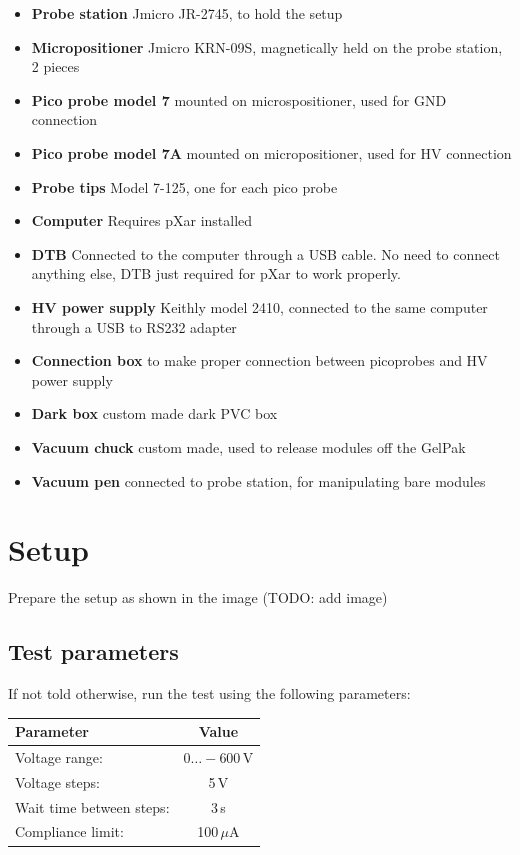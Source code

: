 \documentclass[10pt]{unlsilabsop}
\begin{document}
\begin{itemize}
\item \textbf{Probe station} Jmicro JR-2745, to hold the setup
\item \textbf{Micropositioner} Jmicro KRN-09S, magnetically held on the probe station, 2 pieces
\item \textbf{Pico probe model 7} mounted on microspositioner, used for GND connection
\item \textbf{Pico probe model 7A} mounted on micropositioner, used for HV connection
\item \textbf{Probe tips} Model 7-125, one for each pico probe
\item \textbf{Computer} Requires pXar installed
\item \textbf{DTB} Connected to the computer through a USB cable. No need to connect anything else, DTB just required for pXar to work properly.
\item \textbf{HV power supply} Keithly model 2410, connected to the same computer through a USB to RS232 adapter
\item \textbf{Connection box} to make proper connection between picoprobes and HV power supply
\item \textbf{Dark box} custom made dark PVC box
\item \textbf{Vacuum chuck} custom made, used to release modules off the GelPak
\item \textbf{Vacuum pen} connected to probe station, for manipulating bare modules
\end{itemize}

\section{Setup}

Prepare the setup as shown in the image (TODO: add image)

\subsection{Test parameters}

If not told otherwise, run the test using the following parameters:

\bigskip

\begin{tabular}{lc}
\toprule
Parameter & Value \\
\midrule
Voltage range: & $0\dots-600$\,V \\
Voltage steps: & 5\,V \\
Wait time between steps: & 3\,s \\
Compliance limit: & 100\,$\mu$A \\
\bottomrule
\end{tabular}
\end{document}

